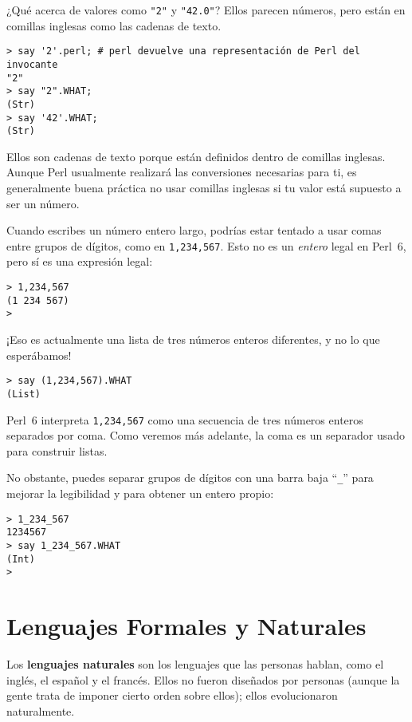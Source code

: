 ¿Qué acerca de valores como \verb'"2"' y \verb'"42.0"'?
Ellos parecen números, pero están en comillas inglesas como las 
cadenas de texto.

\begin{verbatim}
> say '2'.perl; # perl devuelve una representación de Perl del invocante
"2"
> say "2".WHAT;
(Str)
> say '42'.WHAT;
(Str)
\end{verbatim}
%

Ellos son cadenas de texto porque están definidos dentro de comillas inglesas.
Aunque Perl usualmente realizará las conversiones necesarias para ti, es generalmente
buena práctica no usar comillas inglesas si tu valor está supuesto a ser un
número.

Cuando escribes un número entero largo, podrías estar tentado a usar comas
entre grupos de dígitos, como en {\tt 1,234,567}. Esto no es un {\em entero}
legal en Perl~6, pero sí es una expresión legal:

\begin{verbatim}
> 1,234,567
(1 234 567)
>
\end{verbatim}
%
¡Eso es actualmente una lista de tres números enteros diferentes, 
y no lo que esperábamos! 

\begin{verbatim}
> say (1,234,567).WHAT
(List)
\end{verbatim}

Perl~6 interpreta {\tt 1,234,567} como una secuencia de tres números enteros
separados por coma. Como veremos más adelante, la coma es un separador usado
para construir listas.

No obstante, puedes separar grupos de dígitos con una barra baja ``\verb"_"''
para mejorar la legibilidad y para obtener un entero propio:

\begin{verbatim}
> 1_234_567
1234567
> say 1_234_567.WHAT
(Int)
>
\end{verbatim}
%




\section{Lenguajes Formales y Naturales}

Los {\bf lenguajes naturales} son los lenguajes que las personas hablan,
como el inglés, el español y el francés.  Ellos no fueron diseñados por personas
(aunque la gente trata de imponer cierto orden sobre ellos); ellos evolucionaron
naturalmente.

